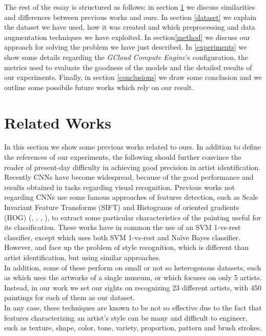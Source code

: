 \documentclass{article}
\begin{document}
The rest of the essay is structured as follows: in section \ref{relwor} we discuss  similarities and differences between previous works and ours. In section \ref{dataset} we explain the dataset we have used, how it was created and which preprocessing and data augmentation techniques we have exploited. In section\ref{method}
we discuss our approach for solving the problem we have just described. In \ref{experiments} we show some details regarding the \textit{GCloud Compute Engine}'s configuration, the metrics used to evaluate the goodness of the models and the detailed results of our experiments. Finally, in section \ref{conclusions} we draw some conclusion and we outline some possibile future works which rely on our result.


\section{Related Works}\label{relwor}

In this section we show some previous works related to ours. In addition to define the references of our experiments, the following should further convince the reader of present-day difficulty in achieving good precision in artist identification.\\
Recently CNNs have become widespread, because of the good performance and results obtained in tasks regarding visual recognition.
Previous works not regarding CNNs use some famous approaches of features detection, such as Scale Invariant Feature Transforms (SIFT) and Histograms of oriented gradients (HOG) (\cite{Saleh2015}, \cite{mensink2014}, \cite{lombardi05}, \cite{jou2011}), to extract some particular characteristics of the painting useful for its classification. These works have in common the use of an SVM 1-vs-rest classifier, except \cite{jou2011} which uses both SVM 1-vs-rest and Naïve Bayes classifier. However, \cite{lombardi05} and \cite{jou2011} face up the problem of style recognition, which is different than artist identification, but using similar approaches.\\
In addition, some of these perform on small or not so heterogenous datasets, such as \cite{mensink2014} which uses the artworks of a single museum, or \cite{jou2011} which focuses on only 5 artists. Instead, in our work we set our sights on recognizing 23 different artists, with 450 paintings for each of them as our dataset. \\
In any case, these techniques are known to be not so effective due to the fact that features characterizing an artist's style can be many and difficult to engineer, such as texture, shape, color, tone, variety, proportion, pattern and brush strokes.\\
\end{document}
